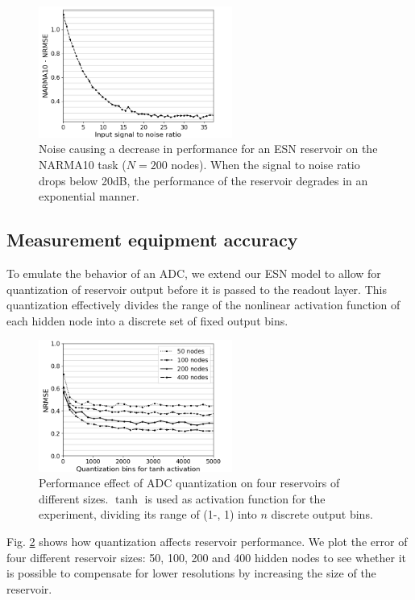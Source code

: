 \begin{figure}
  \centering
  \includegraphics[width=2.5in]{img/input_noise_snr.png}
  \caption{
    Noise causing a decrease in performance for an ESN reservoir on the NARMA10
task ($N = 200$ nodes). When the signal to noise ratio drops below 20dB, the
performance of the reservoir degrades in an exponential manner.
  }
  \label{input_noise_snr}
\end{figure}

\subsection{Measurement equipment accuracy}

To emulate the behavior of an ADC, we extend our ESN model to allow for
quantization of reservoir output before it is passed to the readout layer. This
quantization effectively divides the range of the nonlinear activation function
of each hidden node into a discrete set of fixed output bins.

\begin{figure}[H]
  \centering
  \includegraphics[width=2.5in]{img/adc_quantization.png}
  \caption{
    Performance effect of ADC quantization on four reservoirs of different
sizes. $\tanh$ is used as activation function for the experiment, dividing its
range of (1-, 1) into $n$ discrete output bins.
  }
  \label{adc_quantization}
\end{figure}


Fig. \ref{adc_quantization} shows how quantization affects reservoir
performance. We plot the error of four different reservoir sizes: 50, 100, 200
and 400 hidden nodes to see whether it is possible to compensate for lower
resolutions by increasing the size of the reservoir.

